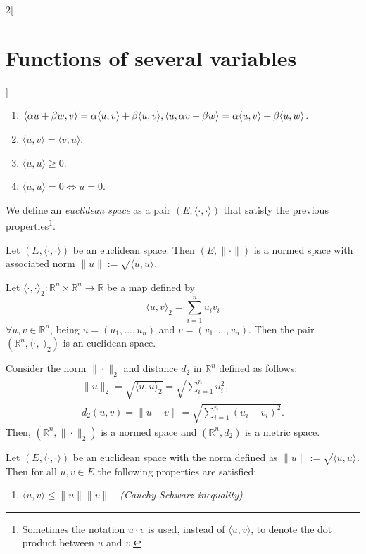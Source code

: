 \documentclass[class=article,10pt,crop=false]{standalone}
\begin{document}
\begin{multicols}{2}[\section{Functions of several variables}]
\begin{definition}
\begin{enumerate}
    \item $\langle \alpha u+\beta w,v\rangle=\alpha\langle u,v\rangle+\beta\langle u,v\rangle,\\\langle u,\alpha v+\beta w\rangle=\alpha\langle u,v\rangle+\beta\langle u,w\rangle$.
    \item $\langle u,v\rangle=\langle v,u\rangle$.
    \item $\langle u,u\rangle\geq 0$.
    \item $\langle u,u\rangle=0\iff u=0$.
\end{enumerate}
We define an \textit{euclidean space} as a pair $(E,\langle\cdot,\cdot\rangle)$ that satisfy the previous properties\footnote{Sometimes the notation $u\cdot v$ is used, instead of $\langle u,v\rangle$, to denote the dot product between $u$ and $v$.}.
\end{definition}
\begin{prop}
Let $(E,\langle\cdot,\cdot\rangle)$ be an euclidean space. Then $(E,\|\cdot\|)$ is a normed space with associated norm $\|u\|:=\sqrt{\langle u,u\rangle}$.
\end{prop}
\begin{prop}
Let $\langle\cdot,\cdot\rangle_2:\mathbb{R}^n\times\mathbb{R}^n\rightarrow\mathbb{R}$ be a map defined by $$\langle u,v\rangle_2=\sum_{i=1}^nu_iv_i$$ $\forall u,v\in \mathbb{R}^n$, being $u=(u_1,\ldots,u_n)$ and $v=(v_1,\ldots,v_n)$. Then the pair $(\mathbb{R}^n,\langle\cdot,\cdot\rangle_2)$ is an euclidean space.
\end{prop}
\begin{corollary}
Consider the norm $\|\cdot\|_2$ and distance $d_2$ in $\mathbb{R}^n$ defined as follows:
\begin{gather*}
    \|u\|_2=\sqrt{\langle u,u\rangle_2}=\sqrt{\sum_{i=1}^nu_i^2},\\
    d_2(u,v)=\|u-v\|=\sqrt{\sum_{i=1}^n(u_i-v_i)^2}.
\end{gather*}
Then, $(\mathbb{R}^n,\|\cdot\|_2)$ is a normed space and $(\mathbb{R}^n,d_2)$ is a metric space.
\end{corollary}
\begin{prop}
Let $(E,\langle\cdot,\cdot\rangle)$ be an euclidean space with the norm defined as $\|u\|:=\sqrt{\langle u,u\rangle}$. Then for all $u,v\in E$ the following properties are satisfied:
\begin{enumerate}
    \item $\langle u,v\rangle\leq\|u\|\|v\|\quad$\textit{(Cauchy-Schwarz inequality)}.

\end{enumerate}
\end{prop}
\end{multicols}
\end{document}
